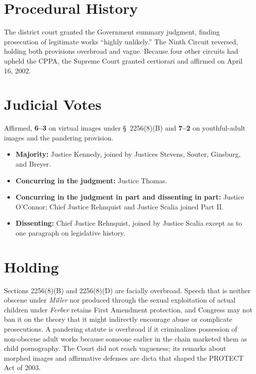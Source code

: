 \documentclass[12pt]{article}
\begin{document}
\section{Procedural History}

The district court granted the Government summary judgment, finding prosecution of legitimate works ``highly unlikely.'' The Ninth Circuit reversed, holding both provisions overbroad and vague. Because four other circuits had upheld the CPPA, the Supreme Court granted certiorari and affirmed on April 16, 2002.

\section{Judicial Votes}

Affirmed, \textbf{6--3} on virtual images under \S~2256(8)(B) and \textbf{7--2} on youthful-adult images and the pandering provision.
\begin{itemize}
\item \textbf{Majority:} Justice Kennedy, joined by Justices Stevens, Souter, Ginsburg, and Breyer.
\item \textbf{Concurring in the judgment:} Justice Thomas.
\item \textbf{Concurring in the judgment in part and dissenting in part:} Justice O'Connor; Chief Justice Rehnquist and Justice Scalia joined Part II.
\item \textbf{Dissenting:} Chief Justice Rehnquist, joined by Justice Scalia except as to one paragraph on legislative history.
\end{itemize}

\section{Holding}

Sections 2256(8)(B) and 2256(8)(D) are facially overbroad. Speech that is neither obscene under \textit{Miller} nor produced through the sexual exploitation of actual children under \textit{Ferber} retains First Amendment protection, and Congress may not ban it on the theory that it might indirectly encourage abuse or complicate prosecutions. A pandering statute is overbroad if it criminalizes possession of non-obscene adult works because someone earlier in the chain marketed them as child pornography. The Court did not reach vagueness; its remarks about morphed images and affirmative defenses are dicta that shaped the PROTECT Act of 2003.
\end{document}
